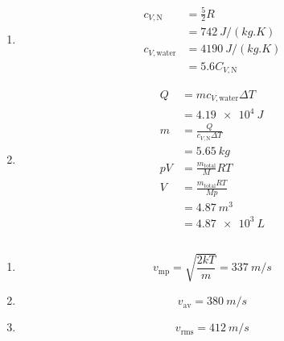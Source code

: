 \documentclass{article}
\begin{document}
\begin{enumerate}
  \item

        \begin{align*}
          c_{V,\text{N}}     & = \frac{5}{2} R        \\
                             & = \qty{742}{J/(kg.K)}  \\
          c_{V,\text{water}} & = \qty{4190}{J/(kg.K)} \\
                             & = 5.6 C_{V,\text{N}}
        \end{align*}

  \item

        \begin{align*}
          Q   & = m c_{V,\text{water}} \Delta T     \\
              & = \qty{4.19e4}{J}                   \\
          m   & = \frac{Q}{c_{V,\text{N}} \Delta T} \\
              & = \qty{5.65}{kg}                    \\
          p V & = \frac{m_\text{total}}{M} R T      \\
          V   & = \frac{m_\text{total} R T}{M p}    \\
              & = \qty{4.87}{m^3}                   \\
              & = \qty{4.87e3}{L}                   \\
        \end{align*}
\end{enumerate}

\setcounter{subsubsection}{40}
\subsubsection{}

\begin{enumerate}
  \item \[v_\text{mp} = \sqrt{\frac{2 k T}{m}} = \qty{337}{m/s}\]

  \item \[v_\text{av} = \qty{380}{m/s}\]

  \item \[v_\text{rms} = \qty{412}{m/s}\]
\end{enumerate}

\setcounter{subsubsection}{42}
\subsubsection{}
\end{document}
